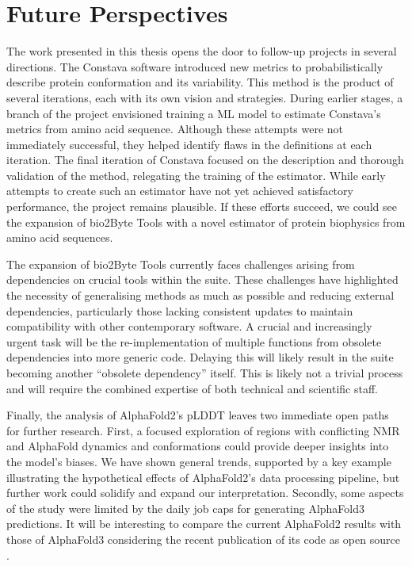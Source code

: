 \section{Future Perspectives}

The work presented in this thesis opens the door to follow-up projects in several directions. The Constava software introduced new metrics to probabilistically describe protein conformation and its variability. This method is the product of several iterations, each with its own vision and strategies. During earlier stages, a branch of the project envisioned training a ML model to estimate Constava's metrics from amino acid sequence. Although these attempts were not immediately successful, they helped identify flaws in the definitions at each iteration. The final iteration of Constava focused on the description and thorough validation of the method, relegating the training of the estimator. While early attempts to create such an estimator have not yet achieved satisfactory performance, the project remains plausible. If these efforts succeed, we could see the expansion of bio2Byte Tools with a novel estimator of protein biophysics from amino acid sequences.

The expansion of bio2Byte Tools currently faces challenges arising from dependencies on crucial tools within the suite. These challenges have highlighted the necessity of generalising methods as much as possible and reducing external dependencies, particularly those lacking consistent updates to maintain compatibility with other contemporary software. A crucial and increasingly urgent task will be the re-implementation of multiple functions from obsolete dependencies into more generic code. Delaying this will likely result in the suite becoming another ``obsolete dependency'' itself. This is likely not a trivial process and will require the combined expertise of both technical and scientific staff.

Finally, the analysis of AlphaFold2's pLDDT leaves two immediate open paths for further research. First, a focused exploration of regions with conflicting NMR and AlphaFold \gls{dynamics} and conformations could provide deeper insights into the model's biases. We have shown general trends, supported by a key example illustrating the hypothetical effects of AlphaFold2's data processing pipeline, but further work could solidify and expand our interpretation. Secondly, some aspects of the study were limited by the daily job caps for generating AlphaFold3 predictions. It will be interesting to compare the current AlphaFold2 results with those of AlphaFold3 considering the recent publication of its code as open source \cite{callaway_ai_2024}. 


